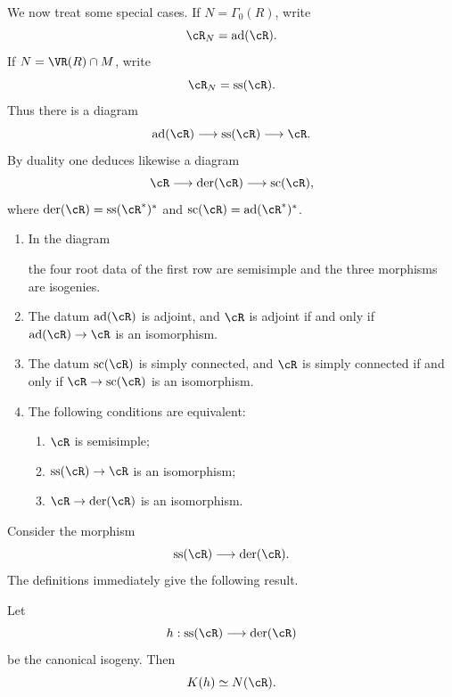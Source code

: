 We now treat some special cases. If \(N=\Gamma_0(R)\), write
\[
 \cR_N=\operatorname{ad}(\cR).
\]
If \(N=\VR(R)\cap M\), write
\[
 \cR_N=\operatorname{ss}(\cR).
\]
Thus there is a diagram
\[
 \operatorname{ad}(\cR)\longrightarrow
 \operatorname{ss}(\cR)\longrightarrow\cR.
\]
By duality one deduces likewise a diagram
\[
 \cR\longrightarrow
 \operatorname{der}(\cR)\longrightarrow
 \operatorname{sc}(\cR),
\]
where \(\operatorname{der}(\cR)=\operatorname{ss}(\cR^\ast)^\ast\) and
\(\operatorname{sc}(\cR)=\operatorname{ad}(\cR^\ast)^\ast\).

\begin{proposition}\label{sga3:XXI:6.5.5}
\begin{enumerate}
\item[(i)] In the diagram
\begin{center}
\end{center}
the four root data of the first row are semisimple and the three
morphisms are isogenies.
\item[(ii)] The datum \(\operatorname{ad}(\cR)\) is adjoint, and
\(\cR\) is adjoint if and only if
\(\operatorname{ad}(\cR)\to\cR\) is an isomorphism.
\item[(iii)] The datum \(\operatorname{sc}(\cR)\) is simply connected,
and \(\cR\) is simply connected if and only if
\(\cR\to\operatorname{sc}(\cR)\) is an isomorphism.
\item[(iv)] The following conditions are equivalent:
\begin{enumerate}
\item[(a)] \(\cR\) is semisimple;
\item[(b)] \(\operatorname{ss}(\cR)\to\cR\) is an isomorphism;
\item[(c)] \(\cR\to\operatorname{der}(\cR)\) is an isomorphism.
\end{enumerate}
\end{enumerate}
\end{proposition}

Consider the morphism
\[
 \operatorname{ss}(\cR)\longrightarrow\operatorname{der}(\cR).
\]
The definitions immediately give the following result.

\begin{lemma}\label{sga3:XXI:6.5.6}
Let
\[
 h:\operatorname{ss}(\cR)\longrightarrow\operatorname{der}(\cR)
\]
be the canonical isogeny. Then
\[
 K(h)\simeq N(\cR).
\]
\end{lemma}

